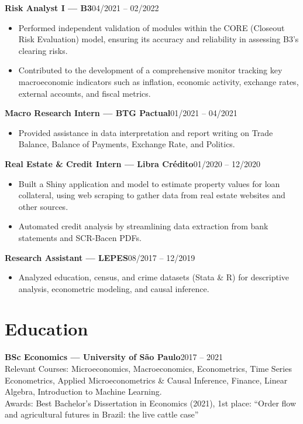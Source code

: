 \documentclass[10pt]{article}
\newcommand{\job}[2]{\textbf{#1}\hfill #2\\[-2pt]}
\begin{document}
\job{Risk Analyst I --- B3}{04/2021 -- 02/2022}
\begin{itemize}
\item Performed independent validation of modules within the CORE (Closeout Risk Evaluation) model, ensuring its accuracy and reliability in assessing B3's clearing risks.
\item Contributed to the development of a comprehensive monitor tracking key macroeconomic indicators such as inflation, economic activity, exchange rates, external accounts, and fiscal metrics.
\end{itemize}
\job{Macro Research Intern --- BTG Pactual}{01/2021 -- 04/2021}
\begin{itemize}
\item Provided assistance in data interpretation and report writing on Trade Balance, Balance of Payments, Exchange Rate, and Politics.
\end{itemize}
\job{Real Estate \& Credit Intern --- Libra Crédito}{01/2020 -- 12/2020}
\begin{itemize}
\item Built a Shiny application and model to estimate property values for loan collateral, using web scraping to gather data from real estate websites and other sources.
\item Automated credit analysis by streamlining data extraction from bank statements and SCR-Bacen PDFs.
\end{itemize}
\job{Research Assistant --- LEPES}{08/2017 -- 12/2019}
\begin{itemize}
\item Analyzed education, census, and crime datasets (Stata \& R) for descriptive analysis, econometric modeling, and causal inference.
\end{itemize}

\section*{Education}
\job{BSc Economics --- University of São Paulo}{2017 -- 2021}
Relevant Courses: Microeconomics, Macroeconomics, Econometrics, Time Series Econometrics, Applied Microeconometrics \& Causal Inference, Finance, Linear Algebra, Introduction to Machine Learning.\\
Awards: Best Bachelor's Dissertation in Economics (2021), 1st place: ``Order flow and agricultural futures in Brazil: the live cattle case''
\end{document}
